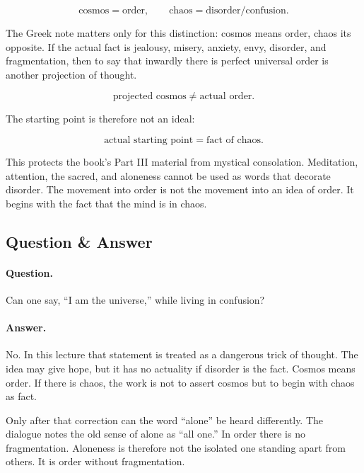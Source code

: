 \documentclass[11pt,oneside]{book}
\begin{document}
\begin{equation}
\text{cosmos} = \text{order},
\qquad
\text{chaos} = \text{disorder/confusion}.
\end{equation}

The Greek note matters only for this distinction: cosmos means order, chaos its opposite. If the actual fact is jealousy, misery, anxiety, envy, disorder, and fragmentation, then to say that inwardly there is perfect universal order is another projection of thought.

\begin{equation}
\text{projected cosmos} \neq \text{actual order}.
\end{equation}

The starting point is therefore not an ideal:

\begin{equation}
\text{actual starting point} = \text{fact of chaos}.
\end{equation}

This protects the book's Part III material from mystical consolation. Meditation, attention, the sacred, and aloneness cannot be used as words that decorate disorder. The movement into order is not the movement into an idea of order. It begins with the fact that the mind is in chaos.

\subsection{Question \& Answer}

\paragraph{Question.}
Can one say, ``I am the universe,'' while living in confusion?

\paragraph{Answer.}
No. In this lecture that statement is treated as a dangerous trick of thought. The idea may give hope, but it has no actuality if disorder is the fact. Cosmos means order. If there is chaos, the work is not to assert cosmos but to begin with chaos as fact.

Only after that correction can the word ``alone'' be heard differently. The dialogue notes the old sense of alone as ``all one.'' In order there is no fragmentation. Aloneness is therefore not the isolated one standing apart from others. It is order without fragmentation.
\end{document}
